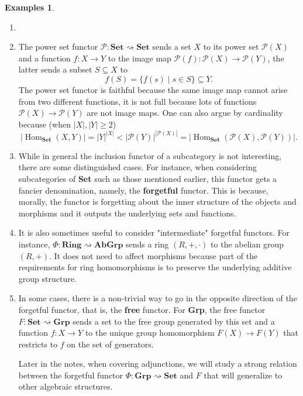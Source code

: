 \documentclass{article}
\theoremstyle{definition}
\newtheorem{exmps}[thm]{Examples}
\theoremstyle{remark}
\newcommand{\mP}{\mathcal{P}}
\DeclareMathOperator{\Hom}{Hom}
\begin{document}
\begin{exmps}
	\begin{enumerate}
		\item[]
		\item The power set functor $\mP: \textbf{Set} \rightsquigarrow \textbf{Set}$ sends a set $X$ to its power set $\mP(X)$ and a function $f: X\rightarrow Y$ to the image map $\mP(f):\mP(X)\rightarrow \mP(Y)$, the latter sends a subset $S\subseteq X$ to \[f(S) = \{f(s) \mid s \in S\} \subseteq Y.\]
		The power set functor is faithful because the same image map cannot arise from two different functions, it is not full because lots of functions $\mP(X) \rightarrow \mP(Y)$ are not image maps. One can also argue by cardinality because (when $|X|, |Y| \geq 2$)
		\[|\Hom_{\textbf{Set}}(X,Y)| = |Y|^{|X|} < |\mP(Y)|^{|\mP(X)|} = |\Hom_{\textbf{Set}}(\mP(X), \mP(Y))|.\]
		\item While in general the inclusion functor of a subcategory is not interesting, there are some distinguished cases. For instance, when considering subcategories of \textbf{Set} such as those mentioned earlier, this functor gets a fancier denomination, namely, the \textbf{forgetful} functor. This is because, morally, the functor is forgetting about the inner structure of the objects and morphisms and it outputs the underlying sets and functions.
		
		\item It is also sometimes useful to consider "intermediate" forgetful functors. For instance, $\Phi: \textbf{Ring} \rightsquigarrow \textbf{AbGrp}$ sends a ring $(R, +, \cdot)$ to the abelian group $(R, +)$. It does not need to affect morphisms because part of the requirements for ring homomorphisms is to preserve the underlying additive group structure.
		
		\item In some cases, there is a non-trivial way to go in the opposite direction of the forgetful functor, that is, the \textbf{free} functor. For \textbf{Grp}, the free functor $F: \textbf{Set} \rightsquigarrow \textbf{Grp}$ sends a set to the free group generated by this set and a function $f: X\rightarrow Y$ to the unique group homomorphism $F(X) \rightarrow F(Y)$ that restricts to $f$ on the set of generators.
		
		Later in the notes, when covering adjunctions, we will study a strong relation between the forgetful functor $\Phi: \textbf{Grp} \rightsquigarrow \textbf{Set}$ and $F$ that will generalize to other algebraic structures.
		

\end{enumerate}
\end{exmps}
\end{document}
